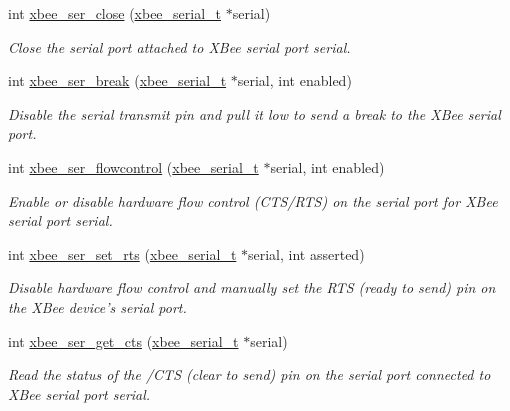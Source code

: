 \begin{DoxyCompactItemize}
int \hyperlink{group__hal__rabbit_ga48b9d743a446074ea6abacd0de24044d}{xbee\-\_\-ser\-\_\-close} (\hyperlink{structxbee__serial__t}{xbee\-\_\-serial\-\_\-t} $\ast$serial)
\begin{DoxyCompactList}\small\item\em Close the serial port attached to X\-Bee serial port {\itshape serial}. \end{DoxyCompactList}\item 
int \hyperlink{group__hal__rabbit_ga6ae89792415a7ac8b45b56188eb9eeb4}{xbee\-\_\-ser\-\_\-break} (\hyperlink{structxbee__serial__t}{xbee\-\_\-serial\-\_\-t} $\ast$serial, int enabled)
\begin{DoxyCompactList}\small\item\em Disable the serial transmit pin and pull it low to send a break to the X\-Bee serial port. \end{DoxyCompactList}\item 
int \hyperlink{group__hal__rabbit_ga1f5f72ffdfbfb45ac523640db32296ff}{xbee\-\_\-ser\-\_\-flowcontrol} (\hyperlink{structxbee__serial__t}{xbee\-\_\-serial\-\_\-t} $\ast$serial, int enabled)
\begin{DoxyCompactList}\small\item\em Enable or disable hardware flow control (C\-T\-S/\-R\-T\-S) on the serial port for X\-Bee serial port {\itshape serial}. \end{DoxyCompactList}\item 
int \hyperlink{group__hal__rabbit_ga731188d8cf41d3d749bc84d51b672535}{xbee\-\_\-ser\-\_\-set\-\_\-rts} (\hyperlink{structxbee__serial__t}{xbee\-\_\-serial\-\_\-t} $\ast$serial, int asserted)
\begin{DoxyCompactList}\small\item\em Disable hardware flow control and manually set the R\-T\-S (ready to send) pin on the X\-Bee device's serial port. \end{DoxyCompactList}\item 
int \hyperlink{group__hal__rabbit_ga894f6fadc890b5ba5ce32338f0acd217}{xbee\-\_\-ser\-\_\-get\-\_\-cts} (\hyperlink{structxbee__serial__t}{xbee\-\_\-serial\-\_\-t} $\ast$serial)
\begin{DoxyCompactList}\small\item\em Read the status of the /\-C\-T\-S (clear to send) pin on the serial port connected to X\-Bee serial port {\itshape serial}. \end{DoxyCompactList}\end{DoxyCompactItemize}


